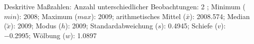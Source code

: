                     \begin{noten}
                	    \note{} Deskritive Maßzahlen:
                	    Anzahl unterschiedlicher Beobachtungen: 2%
                	    ; 
                	      Minimum ($min$): 2008; 
                	      Maximum ($max$): 2009; 
                	      arithmetisches Mittel ($\bar{x}$): \num[round-mode=places,round-precision=2]{2008,574}; 
                	      Median ($\tilde{x}$): 2009; 
                	      Modus ($h$): 2009; 
                	      Standardabweichung ($s$): \num[round-mode=places,round-precision=2]{0,4945}; 
                	      Schiefe ($v$): \num[round-mode=places,round-precision=2]{-0,2995}; 
                	      Wölbung ($w$): \num[round-mode=places,round-precision=2]{1,0897}
                     \end{noten}


